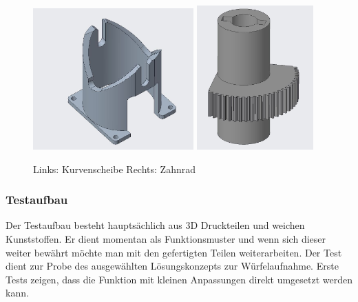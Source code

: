 \documentclass[../../main.tex]{subfiles}
\begin{document}
        \begin{figure}[H]
            \centering
            \includegraphics[width=0.55\textwidth]{../../images/Kran/Kurvenscheibe.JPG}
            \includegraphics[width=0.4\textwidth]{../../images/Kran/Zahnrad.JPG}
            \caption {Links: Kurvenscheibe  Rechts: Zahnrad}
        \end{figure}
        \pagebreak


        \subsubsection{Testaufbau}
        Der Testaufbau besteht hauptsächlich aus 3D Druckteilen und weichen Kunststoffen. Er dient momentan als Funktionsmuster und wenn sich dieser weiter bewährt möchte man mit den gefertigten Teilen weiterarbeiten. Der Test dient zur Probe des ausgewählten Lösungskonzepts zur Würfelaufnahme. Erste Tests zeigen, dass die Funktion mit kleinen Anpassungen direkt umgesetzt werden kann.
\end{document}
